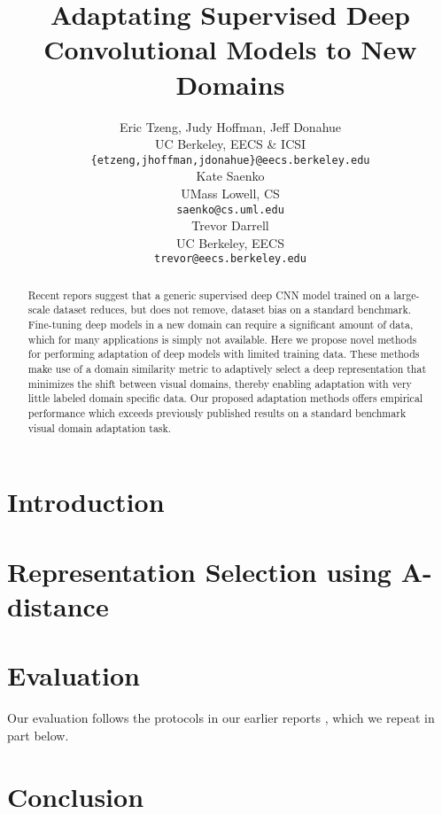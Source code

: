 \documentclass{article} %
\title{Adaptating Supervised Deep Convolutional Models to New Domains}
\author{
Eric Tzeng, Judy Hoffman, Jeff Donahue \\
UC Berkeley, EECS \& ICSI\\
\footnotesize{\texttt{\{etzeng,jhoffman,jdonahue\}@eecs.berkeley.edu} }\\
\And
Kate Saenko \\
UMass Lowell, CS  \\
\footnotesize{\texttt{saenko@cs.uml.edu}} \\
\And
Trevor Darrell \\
UC Berkeley, EECS\\
\footnotesize{\texttt{trevor@eecs.berkeley.edu}} \\
}
\begin{document}
\maketitle

\begin{abstract}
Recent repors suggest that  a generic supervised deep CNN model trained on a large-scale dataset reduces, but does not remove, dataset bias on a standard benchmark. Fine-tuning deep models in a new domain can require a significant amount of data, which for many applications is simply not available. Here
we propose novel methods for performing adaptation of deep models with limited training data.
These methods make use of a domain similarity metric to adaptively select a deep representation that minimizes the shift between visual domains, thereby enabling adaptation with very little labeled domain specific data.
Our proposed adaptation methods offers empirical performance which exceeds previously published results on a standard benchmark visual domain adaptation task.

\end{abstract}

\section{Introduction}


%

\vspace{-.3cm}
\section{Representation Selection using A-distance}
\label{sec:adapt-algs}
\vspace{-.2cm}


\section{Evaluation}
Our evaluation follows the protocols in our earlier reports \cite{ICML-decaf,JudyICLRW}, which we repeat in part below.


\section{Conclusion}



\small{


}
\end{document}
